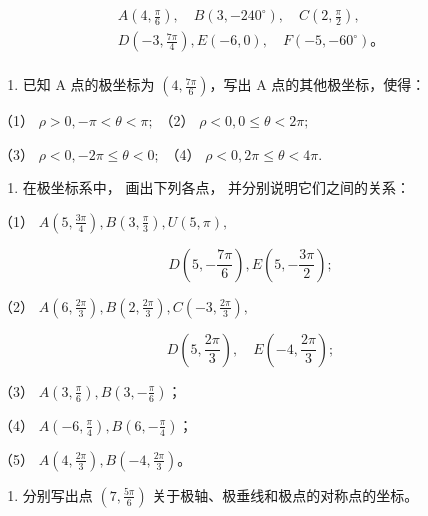 \[
\begin{array}{l} A \left(4, \frac {\pi}{6}\right), \quad B (3, - 240^{\circ}), \quad C \left(2, \frac {\pi}{2}\right), \\ D \left(- 3, \frac {7 \pi}{4}\right), E (- 6, 0), \quad F (- 5, - 60^{\circ})\text{。} \\ \end{array}
\]

\begin{enumerate}
\def\labelenumi{\arabic{enumi}.}
\setcounter{enumi}{2}
\tightlist
\item
  已知 A 点的极坐标为 \(\left(4, \frac{7\pi}{6}\right)\)，写出 A
  点的其他极坐标，使得：
\end{enumerate}

（1） \(\rho > 0, -\pi < \theta < \pi;\) （2）
\(\rho < 0, 0 \leqslant \theta < 2\pi;\)

（3） \(\rho < 0, -2\pi \leqslant \theta < 0;\) （4）
\(\rho < 0, 2\pi \leqslant \theta < 4\pi.\)

\begin{enumerate}
\def\labelenumi{\arabic{enumi}.}
\setcounter{enumi}{3}
\tightlist
\item
  在极坐标系中， 画出下列各点， 并分别说明它们之间的关系：
\end{enumerate}

（1）
\(A\left(5, \frac{3\pi}{4}\right), B\left(3, \frac{\pi}{3}\right), U(5, \pi),\)

\[
D \left(5, - \frac {7 \pi}{6}\right), E \left(5, - \frac {3 \pi}{2}\right);
\]

（2）
\(A\left(6, \frac{2\pi}{3}\right), B\left(2, \frac{2\pi}{3}\right), C\left(-3, \frac{2\pi}{3}\right),\)

\[
D \left(5, \frac {2 \pi}{3}\right), \quad E \left(- 4, \frac {2 \pi}{3}\right);
\]

（3）
\(A\left(3, \frac{\pi}{6}\right), B\left(3, -\frac{\pi}{6}\right)\)；

（4）
\(A\left(-6, \frac{\pi}{4}\right), B\left(6, -\frac{\pi}{4}\right)\)；

（5）
\(A\left(4, \frac{2\pi}{3}\right), B\left(-4, \frac{2\pi}{3}\right)\)。

\begin{enumerate}
\def\labelenumi{\arabic{enumi}.}
\setcounter{enumi}{4}
\tightlist
\item
  分别写出点 \(\left(7, \frac{5\pi}{6}\right)\)
  关于极轴、极垂线和极点的对称点的坐标。
\end{enumerate}

